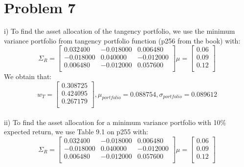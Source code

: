 \documentclass{article}
\begin{document}
\section*{Problem 7}
i) To find the asset allocation of the tangency portfolio, we use the minimum variance portfolio from tangency portfolio function (p256 from the book) with:
\begin{equation*}
\Sigma_{R}=%
\begin{bmatrix}{}
 0.032400 & -0.018000 & 0.006480 \\ 
  -0.018000 & 0.040000 & -0.012000 \\ 
  0.006480 & -0.012000 & 0.057600 \\ 
  \end{bmatrix}
 \mu = \begin{bmatrix}{} 
0.06 \\
0.09 \\
0.12 \\
  \end{bmatrix}
\end{equation*}
We obtain that:
\begin{equation*}
w_{T} = %
\begin{bmatrix}{}
 0.308725 \\ 
  0.424095 \\ 
  0.267179 \\ 
  \end{bmatrix}, 
\mu_{portfolio} = 0.088754,
\sigma_{portfolio} = 0.089612
\end{equation*}  
\vspace{5mm} \\
%
ii) To find the asset allocation for a minimum variance portfolio with 10\% expected return, we use Table 9.1 on p255 with:
\begin{equation*}
\Sigma_{R}=%
\begin{bmatrix}{}
 0.032400 & -0.018000 & 0.006480 \\ 
  -0.018000 & 0.040000 & -0.012000 \\ 
  0.006480 & -0.012000 & 0.057600 \\ 
  \end{bmatrix}
 \mu = \begin{bmatrix}{} 
0.06 \\
0.09 \\
0.12 \\
  \end{bmatrix}
\end{equation*}
\end{document}
